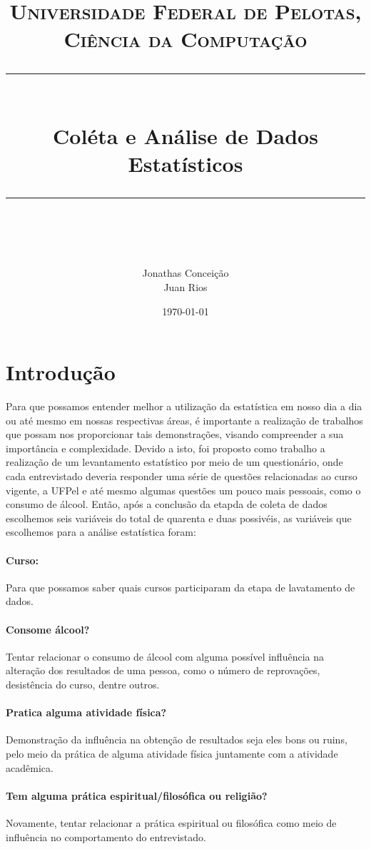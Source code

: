 \documentclass[11pt]{scrartcl} %
\title{
  \normalfont\normalsize
  \textsc{Universidade Federal de Pelotas, Ciência da Computação}\\ %
  \vspace{25pt} %
  \rule{\linewidth}{0.5pt}\\ %
  \vspace{20pt} %
  {\huge Coléta e Análise de Dados Estatísticos}\\ %
  \vspace{12pt} %
  \rule{\linewidth}{2pt}\\ %
  \vspace{12pt} %
}
\author{
  \LARGE Jonathas Conceição\\
  \LARGE Juan Rios
}
\date{\normalsize\today} %
\begin{document}
\maketitle %


\section{Introdução}

Para que possamos entender melhor a utilização da estatística em nosso dia a dia ou até mesmo em nossas respectivas áreas, é importante a realização de trabalhos que possam nos proporcionar tais demonstrações, visando compreender a sua importância e complexidade. Devido a isto, foi proposto como trabalho a realização de um levantamento estatístico por meio de um questionário, onde cada entrevistado deveria responder uma série de questões relacionadas ao curso vigente, a UFPel e até mesmo algumas questões um pouco mais pessoais, como o consumo de álcool. Então, após a conclusão da etapda de coleta de dados escolhemos seis variáveis do total de quarenta e duas possivéis, as variáveis que escolhemos para a análise estatística foram:

\paragraph{\textbf{Curso:}} Para que possamos saber quais cursos participaram da etapa de lavatamento de dados.

\paragraph{\textbf{Consome álcool?}} Tentar relacionar o consumo de álcool com alguma possível influência na alteração dos resultados de uma pessoa, como o número de reprovações, desistência do curso, dentre outros.

\paragraph{\textbf{Pratica alguma atividade física?}} Demonstração da influência na obtenção de resultados seja eles bons ou ruins, pelo meio da prática de alguma atividade física juntamente com a atividade acadêmica.

\paragraph{\textbf{Tem alguma prática espiritual/filosófica ou religião?}} Novamente, tentar relacionar a prática espiritual ou filosófica como meio de influência no comportamento do entrevistado.
\end{document}
